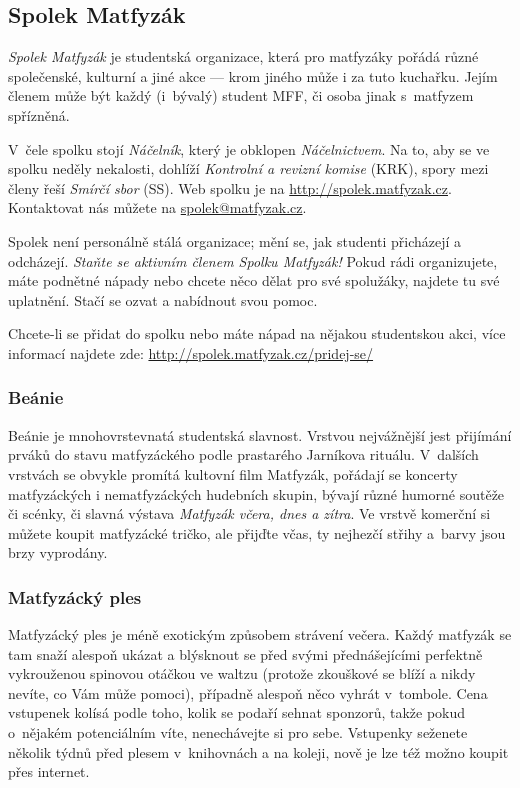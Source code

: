 \subsection{Spolek Matfyzák}

{\it Spolek Matfyzák\/} je studentská organizace, která pro matfyzáky pořádá různé spo\-le\-čen\-ské, kulturní a jiné akce --- krom jiného může i za tuto kuchařku.
Jejím členem může být každý
(i~bývalý) student MFF, či osoba jinak s~matfyzem spřízněná.


V~čele spolku stojí {\it Náčelník}, který je obklopen {\it
Náčelnictvem}. Na to, aby se ve spolku neděly nekalosti, dohlíží
{\it Kontrolní a revizní komise} (KRK), spory mezi členy řeší {\it
Smírčí sbor} (SS). Web spolku je na \url{http://spolek.matfyzak.cz}. Kontaktovat nás můžete na \url{spolek@matfyzak.cz}.

Spolek není personálně stálá
organizace; mění se, jak studenti přicházejí a od\-chá\-zejí. {\it
Staňte se aktivním členem Spolku Matfyzák!} Pokud rádi
organizujete, máte podnětné nápady nebo chcete něco dělat pro své
spolužáky, najdete tu své uplatnění. Stačí se ozvat a nabídnout
svou pomoc.

Chcete-li se přidat do spolku nebo máte nápad na nějakou studentskou akci, více informací najdete zde: \url{http://spolek.matfyzak.cz/pridej-se/}


\subsubsection{Beánie}

Beánie je mnohovrstevnatá studentská slavnost. Vrstvou nejvážnější jest
přijímání prváků do stavu matfyzáckého podle prastarého Jarníkova
rituálu. V~dalších vrstvách se obvykle promítá kultovní film
Matfyzák, pořádají se koncerty matfyzáckých i nematfyzáckých hudebních
skupin, bývají různé humorné soutěže či scénky, či slavná výstava
{\it Matfyzák včera, dnes a zítra}. Ve vrstvě komerční si můžete
koupit matfyzácké tričko, ale přijďte včas, ty nejhezčí střihy
a~barvy jsou brzy vyprodány.

\subsubsection{Matfyzácký ples}

Matfyzácký ples je méně exotickým způsobem strávení večera. Každý matfyzák se tam snaží alespoň ukázat a blýsknout se
před svými přednášejícími perfektně vykrouženou spinovou otáčkou
ve waltzu (protože zkouškové se blíží a nikdy nevíte, co Vám může
pomoci), případně alespoň něco vyhrát v~tombole. Cena vstupenek
kolísá podle toho, kolik se podaří sehnat sponzorů, takže pokud
o~nějakém potenciálním víte, nenechávejte si pro sebe. Vstupenky
seženete několik týdnů před plesem v~knihovnách a na koleji, nově je lze též možno koupit přes internet.

